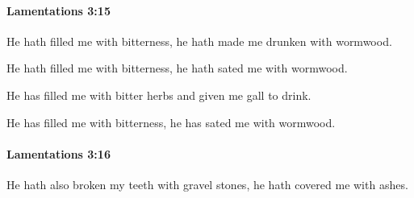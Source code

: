 		\paragraph{Lamentations 3:15} %
			\label{LAMENTATIONS-3-15}

			He hath filled me with bitterness, he hath made me drunken with wormwood.

			\begin{versebox}
					\item[BHS] 
					\item[LXX] 
					\item[ASV] He hath filled me with bitterness, he hath sated me with wormwood.
					\item[NIV] He has filled me with bitter herbs and given me gall to drink.
					\item[NRSV] He has filled me with bitterness, he has sated me with wormwood.
			\end{versebox}

		\paragraph{Lamentations 3:16} %
			\label{LAMENTATIONS-3-16}

			He hath also broken my teeth with gravel stones, he hath covered me with ashes.

